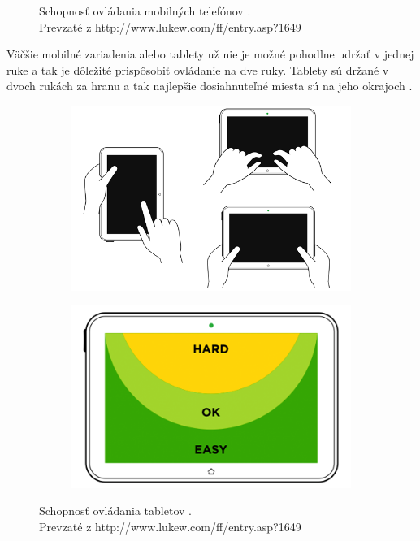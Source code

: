 \begin{figure}[H]
        \caption[Schopnosť ovládania mobilných telefónov]{Schopnosť ovládania mobilných telefónov \cite{navigation}.\\
		Prevzaté z http://www.lukew.com/ff/entry.asp?1649}
		\label{fig:tnavphones}
\end{figure}

Väčšie mobilné zariadenia alebo tablety už nie je možné pohodlne udržať v jednej ruke a tak je dôležité prispôsobiť ovládanie na dve ruky. Tablety sú držané v dvoch rukách za hranu a tak najlepšie dosiahnuteľné miesta sú na jeho okrajoch \cite{mobilebooktouch}.

\begin{figure}[H]
        \centering
        \begin{subfigure}[b]{0.5\textwidth}
                \centering
                \includegraphics[width=\textwidth]{img/tnav-touch-tablets.png}
        \end{subfigure}%
        \begin{subfigure}[b]{0.4\textwidth}
                \centering
                \includegraphics[width=\textwidth]{img/tnav-touch-tablets2.png}
        \end{subfigure}

        \caption[Schopnosť ovládania tabletov]{Schopnosť ovládania tabletov \cite{navigation}.\\
		Prevzaté z http://www.lukew.com/ff/entry.asp?1649}
		\label{fig:tnavtablets2}
\end{figure}

